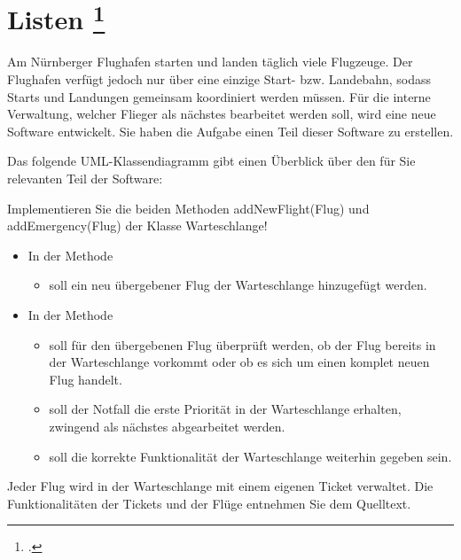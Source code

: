 \documentclass{lehramt-informatik-aufgabe}
\begin{document}

\section{Listen
\footcite[Aufgabe 3]{aud:e-klausur}}

Am Nürnberger Flughafen starten und landen täglich viele Flugzeuge. Der
Flughafen verfügt jedoch nur über eine einzige Start- bzw. Landebahn,
sodass Starts und Landungen gemeinsam koordiniert werden müssen. Für die
interne Verwaltung, welcher Flieger als nächstes bearbeitet werden soll,
wird eine neue Software entwickelt. Sie haben die Aufgabe einen Teil
dieser Software zu erstellen.

Das folgende UML-Klassendiagramm gibt einen Überblick über den für Sie
relevanten Teil der Software:

Implementieren Sie die beiden Methoden addNewFlight(Flug) und
addEmergency(Flug) der Klasse Warteschlange!

\begin{itemize}
\item In der Methode 

\begin{itemize}
\item soll ein neu übergebener Flug der Warteschlange hinzugefügt werden.
\end{itemize}

\item In der Methode 

\begin{itemize}
\item soll für den übergebenen Flug überprüft werden, ob der Flug
bereits in der Warteschlange vorkommt oder ob es sich um einen komplet
neuen Flug handelt.

\item soll der Notfall die erste Priorität in der Warteschlange
erhalten, \dh zwingend als nächstes abgearbeitet werden.

\item soll die korrekte Funktionalität der Warteschlange weiterhin
gegeben sein.
\end{itemize}
\end{itemize}

Jeder Flug wird in der Warteschlange mit einem eigenen Ticket verwaltet.
Die Funktionalitäten der Tickets und der Flüge entnehmen Sie dem
Quelltext.

\begin{liAntwort}





\end{liAntwort}
\end{document}
